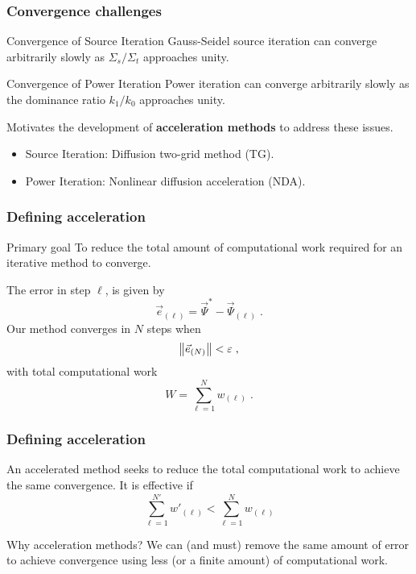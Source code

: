 \documentclass[xcolor=x11names, compress, handout]{beamer}
\begin{document}
\begin{frame}
  \frametitle{Convergence challenges}
\begin{block}{Convergence of Source Iteration}
  Gauss-Seidel source iteration can converge arbitrarily slowly as
  $\Sigma_s/\Sigma_t$ approaches unity.
\end{block}
\pause
\begin{block}{Convergence of Power Iteration}
  Power iteration can converge arbitrarily slowly as the dominance
  ratio $k_1/k_0$ approaches unity.
\end{block}
\pause
Motivates the development of \textbf{acceleration methods} to address these issues.
\begin{itemize}
  \item Source Iteration: Diffusion two-grid method (TG).
  \item Power Iteration: Nonlinear diffusion acceleration (NDA).
\end{itemize}

\end{frame}
\begin{frame}
  \frametitle{Defining acceleration}
  \pause
  \begin{block}{Primary goal}
    To reduce the total amount of computational work required for an
    iterative method to converge\cite{adams1993}.
  \end{block}
\pause
The error in step $\ell$, is given by
\begin{equation*}
  \vec{e}_{(\ell)} = \vec{\Psi}^* - \vec{\Psi}_{(\ell)}\;.
\end{equation*}
\pause
Our method converges in $N$ steps when
\begin{equation*}
  \left\lVert\vec{e}_{(N)}\right\rVert < \varepsilon\;,
\end{equation*}
\pause
with total computational work
\begin{equation*}
  W = \sum_{\ell = 1}^N w_{(\ell)}\;.
\end{equation*}
\end{frame}
\begin{frame}
  \frametitle{Defining acceleration}
  An accelerated method seeks to reduce the total computational work
  to achieve the same convergence. It is effective if
  \begin{equation*}
    \sum_{\ell = 1}^{N'}w'_{(\ell)} <  \sum_{\ell = 1}^Nw_{(\ell)}
  \end{equation*}
\pause
  \begin{block}{Why acceleration methods?}
    We can (and must) remove the same amount of error to achieve
    convergence using less (or a finite amount) of computational work.
  \end{block}
\end{frame}
\end{document}
